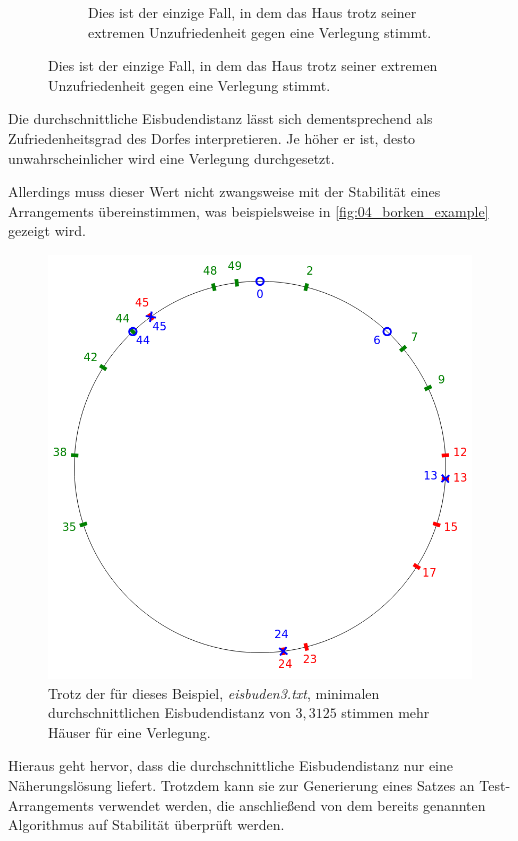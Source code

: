 \documentclass[a4paper,10pt,ngerman]{scrartcl}
\begin{document}
\begin{figure}[ht]
\begin{subfigure}[t]{0.4\linewidth}
        \caption{Dies ist der einzige Fall, in dem das Haus trotz seiner extremen Unzufriedenheit gegen eine Verlegung stimmt.}
        \label{fig:03_slightly_happy_house}
    \end{subfigure}
\end{figure}
Die durchschnittliche Eisbudendistanz lässt sich dementsprechend als \glqq Zufriedenheitsgrad\grqq{} des Dorfes interpretieren.
Je höher er ist, desto unwahrscheinlicher wird eine Verlegung durchgesetzt.

Allerdings muss dieser Wert nicht zwangsweise mit der Stabilität eines Arrangements übereinstimmen, was beispielsweise in \autoref{fig:04_borken_example} gezeigt wird.
\begin{figure}[ht]
    \centering
    \includegraphics[width=0.4\linewidth]{04_broken_example.png}
    \caption{Trotz der für dieses Beispiel, \textit{eisbuden3.txt}, minimalen durchschnittlichen Eisbudendistanz von $3,3125$ stimmen mehr Häuser für eine Verlegung.}
    \label{fig:04_borken_example}
\end{figure}
Hieraus geht hervor, dass die durchschnittliche Eisbudendistanz nur eine Näherungslösung liefert.
Trotzdem kann sie zur Generierung eines Satzes an Test-Arrangements verwendet werden, die anschließend von dem bereits genannten Algorithmus auf Stabilität überprüft werden.
\end{document}
